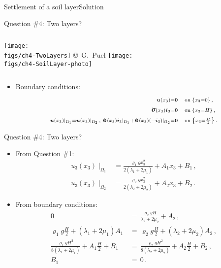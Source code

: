 \documentclass{beamer}
\newcommand{\uj}{u}
\newcommand{\xj}{x}
\newcommand{\uv}{{\boldsymbol\uj}}
\renewcommand{\ij}{i}
\newcommand{\iv}{{\boldsymbol\ij}}
\newcommand{\medium}{\Omega}
\newcommand{\roi}{\varrho}
\newcommand{\stress}{\mbox{$\hspace{0.3em}\rotatebox[x=0pt,y=0.2pt]{90}{\rule{0.017\linewidth}{0.4pt}}\hspace{-0.25em}\upsigma$}}
\newcommand{\bzero}{{\bf 0}}
\begin{document}
\begin{frame}{Settlement of a soil layer}{Solution}
\begin{overprint}
\vskip-20pt
\begin{exampleblock}{Question \#4: Two layers?}
\begin{columns}[t]
\centering\texttt{[image: \\figs/ch4-TwoLayers]}
\vskip-7pt{\hspace{2.7truecm}\mbox{\tiny{\copyright\ G. Puel}}}
\vskip-85pt
\centering\texttt{[image: \\figs/ch4-SoilLayer-photo]}
\end{columns}
\begin{itemize}
\item Boundary conditions:
\begin{displaymath}
\begin{split}
\scriptstyle \uv(\xj_3)=\bzero & \scriptstyle \quad\text{on}\;\{\xj_3=0\} \,, \\
\scriptstyle \stress(\xj_3)\iv_3=\bzero & \scriptstyle \quad\text{on}\;\{\xj_3=H\} \,, \\
\scriptstyle \uv(\xj_3)\mid_{\medium_1}=\uv(\xj_3)\mid_{\medium_2}\,,\; \stress(\xj_3)\iv_3\mid_{\medium_1}+\stress(\xj_3)(-\iv_3)\mid_{\medium_2}=\bzero  &  \scriptstyle \quad\text{on}\;\left\{\xj_3=\frac{H}{2}\right\}\,.
\end{split}
\end{displaymath}
\end{itemize}
\end{exampleblock}

\vskip-20pt
\begin{exampleblock}{Question \#4: Two layers?}
\begin{itemize}
\item From Question \#1:
\begin{displaymath}
\begin{split}
\scriptstyle \uj_3(\xj_3)\mid_{\medium_1} & \scriptstyle =\frac{\roi_1 g\xj_3^2}{2(\lambda_1+2\mu_1)}+A_1\xj_3+B_1 \,, \\
\scriptstyle \uj_3(\xj_3)\mid_{\medium_2} & \scriptstyle =\frac{\roi_2 g\xj_3^2}{2(\lambda_2+2\mu_2)}+A_2\xj_3+B_2 \,.
\end{split}
\end{displaymath}
\item From boundary conditions:
\begin{displaymath}
\begin{split}
\scriptstyle 0 \, & \scriptstyle = \, \frac{\roi_2 gH}{\lambda_2+2\mu_2}+A_2 \,, \\
\scriptstyle \roi_1 g\frac{H}{2}+(\lambda_1+2\mu_1)A_1 \, & \scriptstyle =  \, \roi_2 g\frac{H}{2}+(\lambda_2+2\mu_2)A_2  \,, \\
\scriptstyle \frac{\roi_1 g H^2}{8(\lambda_1+2\mu_1)}+A_1\frac{H}{2}+B_1 \, & \scriptstyle = \, \frac{\roi_2 g H^2}{8(\lambda_2+2\mu_2)}+A_2\frac{H}{2}+B_2 \,, \\
\scriptstyle B_1 \, & \scriptstyle = \, 0 \,.
\end{split}
\end{displaymath}
\end{itemize}
\end{exampleblock}


\end{overprint}
\end{frame}
\end{document}
